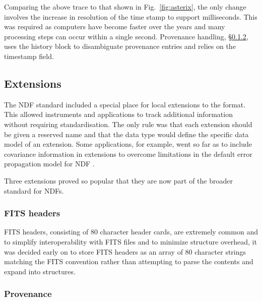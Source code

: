 \documentclass[final,authoryear,5p,times,twocolumn]{elsarticle}
\begin{document}
Comparing the above trace to that shown in Fig.\ \ref{fig:asterix},
the only change involves the increase in resolution of the time
stamp to support milliseconds. This was required as computers have
become faster over the years and many processing steps can occur
within a single second. Provenance handling, \S\ref{sec:provenance},
uses the history block to disambiguate provenance entries and relies
on the timestamp field.

\subsection{Extensions}

The NDF standard included a special place for local extensions to the
format. This allowed instruments and applications to track additional
information without requiring standardisation. The only rule was that
each extension should be given a reserved name and that the data type
would define the specific data model of an extension. Some
applications, for example, went so far as to include covariance
information in extensions to overcome limitations in the default error
propagation model for NDF \citep[for example SPECDRE;][]{SUN140}.

Three extensions proved so popular that they are now part of the broader
standard for NDFs.

\subsubsection{FITS headers}

FITS headers, consisting of 80 character header cards, are extremely
common and to simplify interoperability with FITS files and to
minimize structure overhead, it was decided early on to store FITS
headers as an array of 80 character strings matching the FITS
convention rather than attempting to parse the contents and expand
into structures.

\subsubsection{Provenance}
\label{sec:provenance}
\end{document}
